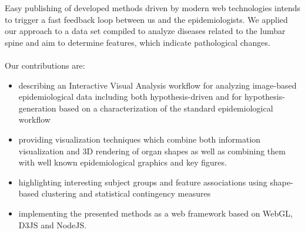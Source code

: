 \documentclass[journal]{style/vgtc} 			          %
\begin{document}
%
Easy publishing of developed methods driven by modern web technologies intends to trigger a fast feedback loop between us and the epidemiologists.
We applied our approach to a data set compiled to analyze diseases related to the lumbar spine and aim to determine features, which indicate pathological changes.
\\\\
Our contributions are:
\begin{itemize}
	\item describing an Interactive Visual Analysis workflow for analyzing image-based epidemiological data including both hypothesis-driven and for hypothesis-generation based on a characterization of the standard epidemiological workflow
	\item providing visualization techniques which combine both information visualization and 3D rendering of organ shapes as well as combining them with well known epidemiological graphics and key figures.
	\item highlighting interesting subject groups and feature associations using shape-based clustering and statistical contingency measures
	\item implementing the presented methods as a web framework based on WebGL, D3JS and NodeJS.
\end{itemize}
\end{document}
